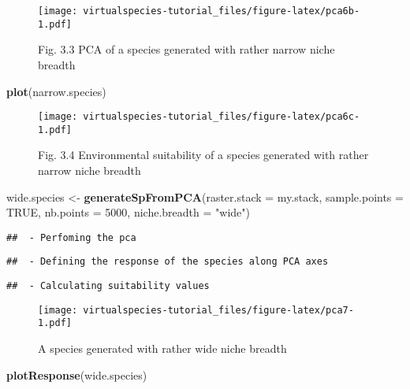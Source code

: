 \documentclass[]{article}
\newenvironment{Shaded}{\begin{snugshade}}{\end{snugshade}}
\newcommand{\KeywordTok}[1]{\textcolor[rgb]{0.13,0.29,0.53}{\textbf{#1}}}
\newcommand{\DataTypeTok}[1]{\textcolor[rgb]{0.13,0.29,0.53}{#1}}
\newcommand{\DecValTok}[1]{\textcolor[rgb]{0.00,0.00,0.81}{#1}}
\newcommand{\StringTok}[1]{\textcolor[rgb]{0.31,0.60,0.02}{#1}}
\newcommand{\OtherTok}[1]{\textcolor[rgb]{0.56,0.35,0.01}{#1}}
\newcommand{\NormalTok}[1]{#1}
\begin{document}
\begin{figure}
\centering
\texttt{[image: virtualspecies-tutorial\_files/figure-latex/pca6b-1.pdf]}
\caption{Fig. 3.3 PCA of a species generated with rather narrow niche
breadth}
\end{figure}

\begin{Shaded}
\begin{Highlighting}[]
\KeywordTok{plot}\NormalTok{(narrow.species)}
\end{Highlighting}
\end{Shaded}

\begin{figure}
\centering
\texttt{[image: virtualspecies-tutorial\_files/figure-latex/pca6c-1.pdf]}
\caption{Fig. 3.4 Environmental suitability of a species generated with
rather narrow niche breadth}
\end{figure}

\begin{Shaded}
\begin{Highlighting}[]
\NormalTok{wide.species <-}\StringTok{ }\KeywordTok{generateSpFromPCA}\NormalTok{(}\DataTypeTok{raster.stack =}\NormalTok{ my.stack, }\DataTypeTok{sample.points =} \OtherTok{TRUE}\NormalTok{,}
                                    \DataTypeTok{nb.points =} \DecValTok{5000}\NormalTok{,}
                                    \DataTypeTok{niche.breadth =} \StringTok{"wide"}\NormalTok{)}
\end{Highlighting}
\end{Shaded}

\begin{verbatim}
##  - Perfoming the pca
\end{verbatim}

\begin{verbatim}
##  - Defining the response of the species along PCA axes
\end{verbatim}

\begin{verbatim}
##  - Calculating suitability values
\end{verbatim}

\begin{figure}
\centering
\texttt{[image: virtualspecies-tutorial\_files/figure-latex/pca7-1.pdf]}
\caption{A species generated with rather wide niche breadth}
\end{figure}

\begin{Shaded}
\begin{Highlighting}[]
\KeywordTok{plotResponse}\NormalTok{(wide.species)}
\end{Highlighting}
\end{Shaded}
\end{document}
